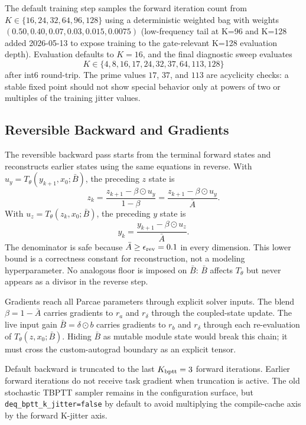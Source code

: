 \documentclass[11pt]{article}
\begin{document}
The default training step samples the forward iteration count from
$K\in\{16,24,32,64,96,128\}$ using a deterministic weighted bag with weights
$(0.50,0.40,0.07,0.03,0.015,0.0075)$ (low-frequency tail at K=96 and
K=128 added 2026-05-13 to expose training to the gate-relevant K=128
evaluation depth).  Evaluation defaults to
$K=16$, and the final diagnostic sweep evaluates
\[
  K\in\{4,8,16,17,24,32,37,64,113,128\}
\]
after int6 round-trip.  The prime values $17$, $37$, and $113$ are acyclicity
checks: a stable fixed point should not show special behavior only at powers
of two or multiples of the training jitter values.

\subsection{Reversible Backward and Gradients}
\label{sec:revdeq_backward_combined}

The reversible backward pass starts from the terminal forward states and
reconstructs earlier states using the same equations in reverse.  With
$u_y=T_\theta(y_{k+1},x_0;\bar B)$, the preceding $z$ state is
\[
  z_k = \frac{z_{k+1}-\beta\odot u_y}{1-\beta}
      = \frac{z_{k+1}-\beta\odot u_y}{\bar A}.
\]
With $u_z=T_\theta(z_k,x_0;\bar B)$, the preceding $y$ state is
\[
  y_k = \frac{y_{k+1}-\beta\odot u_z}{\bar A}.
\]
The denominator is safe because $\bar A\ge\epsilon_{\rm rev}=0.1$ in every
dimension.  This lower bound is a correctness constant for reconstruction,
not a modeling hyperparameter.  No analogous floor is imposed on $\bar B$:
$\bar B$ affects $T_\theta$ but never appears as a divisor in the reverse
step.

Gradients reach all Parcae parameters through explicit solver inputs.  The
blend $\beta=1-\bar A$ carries gradients to $r_a$ and $r_\delta$ through the
coupled-state update.  The live input gain $\bar B=\delta\odot b$ carries
gradients to $r_b$ and $r_\delta$ through each re-evaluation of
$T_\theta(z,x_0;\bar B)$.  Hiding $\bar B$ as mutable module state would break
this chain; it must cross the custom-autograd boundary as an explicit tensor.

Default backward is truncated to the last $K_{\rm bptt}=3$ forward
iterations.  Earlier forward iterations do not receive task gradient when
truncation is active.  The old stochastic TBPTT sampler remains in the
configuration surface, but \texttt{deq\_bptt\_k\_jitter=false} by default to
avoid multiplying the compile-cache axis by the forward K-jitter axis.
\end{document}
